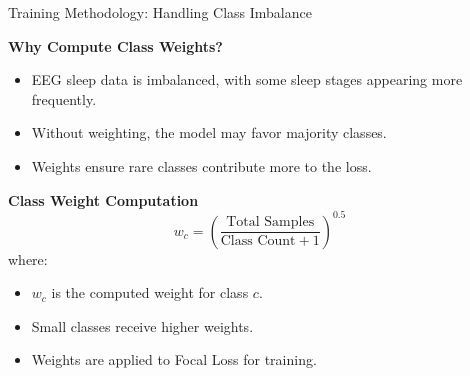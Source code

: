 \begin{frame}{Training Methodology: Handling Class Imbalance}

    \textbf{\large Why Compute Class Weights?}
    \vspace{5pt}
    \begin{itemize}
        \item EEG sleep data is imbalanced, with some sleep stages appearing more frequently.
        \item Without weighting, the model may favor majority classes.
        \item Weights ensure rare classes contribute more to the loss.
    \end{itemize}

    \vspace{10pt}
    \textbf{\large Class Weight Computation}
    \vspace{5pt}
    \[
    w_c = \left( \frac{\text{Total Samples}}{\text{Class Count} + 1} \right)^{0.5}
    \]
    where:
    \begin{itemize}
        \item \( w_c \) is the computed weight for class \( c \).
        \item Small classes receive higher weights.
        \item Weights are applied to Focal Loss for training.
    \end{itemize}

\end{frame}

















 

 